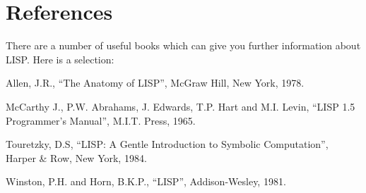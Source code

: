 \section{References}

There are a number of useful books which can give you further information
about LISP. Here is a selection:

 Allen, J.R., ``The Anatomy of LISP'', McGraw Hill, New York, 1978.

 McCarthy J., P.W. Abrahams, J. Edwards, T.P. Hart and
     M.I. Levin, ``LISP 1.5 Programmer's Manual'', M.I.T. Press, 1965.

 Touretzky, D.S, ``{LISP}: A Gentle Introduction to Symbolic Computation'',
 Harper \& Row, New York, 1984.

 Winston, P.H. and Horn, B.K.P., ``LISP'', Addison-Wesley, 1981.

